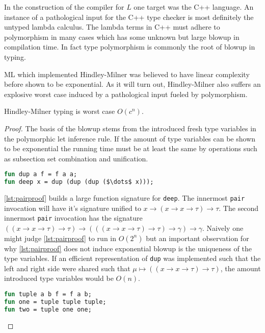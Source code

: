 \documentclass[11pt,oneside,a4paper]{report}
\begin{document}
In the construction of the compiler for $L$ one target was the C++ language.
An instance of a pathological input for the C++ type checker is most definitely the untyped lambda calculus.
The lambda terms in C++ must adhere to polymorphism in many cases which has some unknown but large blowup in compilation time.
In fact type polymorphism is commonly the root of blowup in typing.

ML which implemented Hindley-Milner was believed to have linear complexity before shown to be exponential.
As it will turn out, Hindley-Milner also suffers an explosive worst case induced by a pathological input fueled by polymorphism.

\begin{lemma}
    Hindley-Milner typing is worst case $O(c^n)$.
\end{lemma}
\begin{proof}
    The basis of the blowup stems from the introduced fresh type variables in the polymorphic let inference rule.
    If the amount of type variables can be shown to be exponential the running time must be at least the same by operations such as subsection set combination and unification.
\begin{lstlisting}[language=ML,caption={Nested pair},label={lst:pairproof},mathescape=true]
fun dup a f = f a a;
fun deep x = dup (dup (dup ($\dots$ x)));
\end{lstlisting}
    \autoref{lst:pairproof} builds a large function signature for \texttt{deep}.
    The innermost \texttt{pair} invocation will have it's signature unified to $x \rightarrow (x \rightarrow x \rightarrow \tau) \rightarrow \tau$.
    The second innermost \texttt{pair} invocation has the signature $((x \rightarrow x \rightarrow \tau) \rightarrow \tau) \rightarrow (((x \rightarrow x \rightarrow \tau) \rightarrow \tau) \rightarrow \gamma) \rightarrow \gamma$.
    Naively one might judge \autoref{lst:pairproof} to run in $O(2^n)$ but an important observation for why \autoref{lst:pairproof} does not induce exponential blowup is the uniqueness of the type variables.
    If an efficient representation of \texttt{dup} was implemented such that the left and right side were shared such that $\mu \mapsto ((x \rightarrow x \rightarrow \tau) \rightarrow \tau)$, the amount introduced type variables would be $O(n)$.
\begin{lstlisting}[language=ML,caption={Nested pairs with different type variables},label={lst:pairproofexp},mathescape=true]
fun tuple a b f = f a b;
fun one = tuple tuple tuple;
fun two = tuple one one;

\end{lstlisting}
\end{proof}
\end{document}

